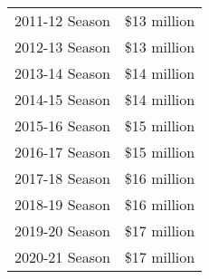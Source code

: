 \documentclass[
]{book}
\begin{document}
\begin{enumerate}
  \begin{longtable}[]{@{}lc@{}}
  \toprule()
  \endhead
  2011-12 Season & \$13 million \\
  2012-13 Season & \$13 million \\
  2013-14 Season & \$14 million \\
  2014-15 Season & \$14 million \\
  2015-16 Season & \$15 million \\
  2016-17 Season & \$15 million \\
  2017-18 Season & \$16 million \\
  2018-19 Season & \$16 million \\
  2019-20 Season & \$17 million \\
  2020-21 Season & \$17 million \\
  \bottomrule()
  \end{longtable}


\end{enumerate}
\end{document}
